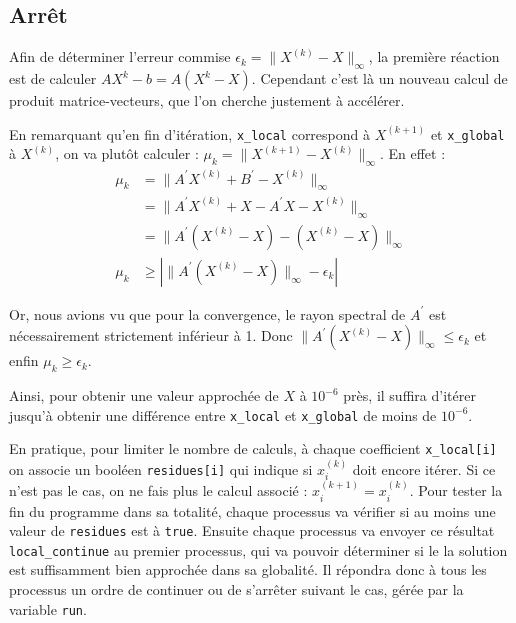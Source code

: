 \documentclass[11pt, a4paper]{article}
\begin{document}
\newpage
\subsection{Arrêt}

Afin de déterminer l'erreur commise \(\epsilon_k = \|X^{(k)} - X \|_\infty\), la première réaction est de calculer \(AX^{k}-b = A(X^{k}-X)\).
Cependant c'est là un nouveau calcul de produit matrice-vecteurs, que l'on cherche justement à accélérer.

En remarquant qu'en fin d'itération, \lstinline{x_local} correspond à \(X^{(k+1)}\) et \lstinline{x_global} à \(X^{(k)}\), on va plutôt calculer :
\(    \mu_k = \| X^{(k+1)} - X^{(k)} \|_\infty \).
En effet :
\begin{align*}
    \mu_k &= \| A^\prime X^{(k)} + B^\prime - X^{(k)} \|_\infty \\
    &= \| A^\prime X^{(k)} + X - A^\prime X- X^{(k)} \|_\infty \\
    &= \| A^\prime (X^{(k)} - X) - ( X^{(k)} - X ) \|_\infty \\
    \mu_k &\geq \left| \| A^\prime (X^{(k)} - X) \|_\infty - \epsilon_k \right|
\end{align*}

Or, nous avions vu que pour la convergence, le rayon spectral de \(A^\prime\) est nécessairement strictement inférieur à 1.
Donc \(\| A^\prime (X^{(k)} - X) \|_\infty \leq \epsilon_k \) et enfin
\(\mu_k \geq \epsilon_k\).

Ainsi, pour obtenir une valeur approchée de \(X\) à \(10^{-6}\) près,
il suffira d'itérer jusqu'à obtenir une différence entre \lstinline{x_local}
et \lstinline{x_global} de moins de \(10^{-6}\).

\bigskip

En pratique, pour limiter le nombre de calculs, à chaque coefficient
\lstinline{x_local[i]} on associe un booléen \lstinline{residues[i]}
qui indique si \(x^{(k)}_i\) doit encore itérer.
Si ce n'est pas le cas, on ne fais plus le calcul associé : \(x^{(k+1)}_i = x^{(k)}_i\).
Pour tester la fin du programme dans sa totalité, chaque processus va vérifier
si au moins une valeur de \lstinline{residues} est à \lstinline{true}.
Ensuite chaque processus va envoyer ce résultat \lstinline{local_continue} au premier processus, qui va pouvoir déterminer si le la solution est suffisamment bien approchée dans sa globalité.
Il répondra donc à tous les processus un ordre de continuer ou de s'arrêter suivant le cas, gérée par la variable \lstinline{run}.
\end{document}
